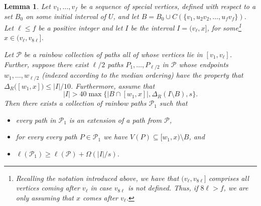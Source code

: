 \documentclass[a4paper,11pt]{article}
\newtheorem{lemma}[theorem]{\bf Lemma}
\theoremstyle{definition}
\def\cP{\mathcal{P}}
\begin{document}
\begin{lemma}\label{lemma:tournaments}
Let $v_1, \dots, v_f$ be a sequence of special vertices, defined with respect to a set $B_0$ on some initial interval of $U$, and let $B=B_0\cup C(\{v_1, u_2v_2, \dots, u_fv_f\})$. Let $\ell\leq f$ be a positive integer and let $I$ be the interval $I=(v_\ell, x]$, for some\footnote{Recalling the notation introduced above, we have that $(v_\ell, v_{8\ell}]$ comprises all vertices coming after $v_\ell$ in case $v_{8\ell}$ is not defined. Thus, if $8\ell>f$, we are only assuming that $x$ comes after $v_\ell$.} $x\in (v_\ell, v_{8\ell}]$.

Let $\cP$ be a rainbow collection of paths all of whose vertices lie in $[v_1, v_\ell]$. Further, suppose there exist $\ell/2$ paths $P_1, \dots, P_{\ell/2}$ in $\cP$ whose endpoints $w_1, \dots, w_{\ell/2}$ (indexed according to the median ordering) have the property that $\Delta_R\big([w_1, x]\big)\leq |I|/10$. Furthermore, assume that 
\begin{equation}\label{eq:basic lemma condition}
|I|> 40\max\{|B\cap [w_1, x]|, \Delta_R(I\setminus B), s\}.
\end{equation}
Then there exists a collection of rainbow paths $\cP_1$ such that 
\begin{itemize}
    \item[(i)] every path in $\cP_1$ is an extension of a path from $\cP$, 
    \item[(ii)] for every every path $P\in \cP_1$ we have $V(P)\subseteq [w_1, x)\setminus B$, and
    \item[(iii)] $\ell(\cP_1)\geq \ell(\cP)+\Omega(|I|/s)$.
\end{itemize}
\end{lemma}
\end{document}
